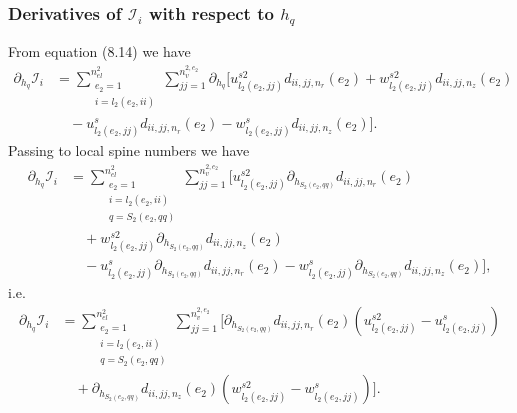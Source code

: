 \documentclass{article}
\begin{document}
\subsubsection{Derivatives of $\mathcal{I}_i$ with respect to $h_q$} %
From equation (8.14) we have
\begin{align}
\partial_{h_q} \mathcal{I}_i &= \sum_{\substack{e_2=1\\ i=l_2(e_2,ii)}}^{n_{el}^2} \sum_{jj=1}^{n_v^{2,e_2}} \partial_{h_q} \Bigg[ u_{l_2(e_2,jj)}^{s2} d_{ii,jj,n_r}(e_2) + w_{l_2(e_2,jj)}^{s2} d_{ii,jj,n_z}(e_2) \nonumber\\
&\quad - u_{l_2(e_2,jj)}^s d_{ii,jj,n_r}(e_2) - w_{l_2(e_2,jj)}^s d_{ii,jj,n_z}(e_2) \Bigg]. \tag{8.23}
\end{align}
Passing to local spine numbers we have
\begin{align}
\partial_{h_q} \mathcal{I}_i &= \sum_{\substack{e_2=1\\ i=l_2(e_2,ii)\\ q=S_2(e_2,qq)}}^{n_{el}^2} \sum_{jj=1}^{n_v^{2,e_2}} \Bigg[ u_{l_2(e_2,jj)}^{s2} \partial_{h_{S_2(e_2,qq)}} d_{ii,jj,n_r}(e_2) \nonumber\\
&\quad + w_{l_2(e_2,jj)}^{s2} \partial_{h_{S_2(e_2,qq)}} d_{ii,jj,n_z}(e_2) \nonumber\\
&\quad - u_{l_2(e_2,jj)}^s \partial_{h_{S_2(e_2,qq)}} d_{ii,jj,n_r}(e_2) - w_{l_2(e_2,jj)}^s \partial_{h_{S_2(e_2,qq)}} d_{ii,jj,n_z}(e_2) \Bigg], \tag{8.24}
\end{align}
i.e.
\begin{align}
\partial_{h_q} \mathcal{I}_i &= \sum_{\substack{e_2=1\\ i=l_2(e_2,ii)\\ q=S_2(e_2,qq)}}^{n_{el}^2} \sum_{jj=1}^{n_v^{2,e_2}} \Bigg[ \partial_{h_{S_2(e_2,qq)}} d_{ii,jj,n_r}(e_2) \left( u_{l_2(e_2,jj)}^{s2} - u_{l_2(e_2,jj)}^s \right) \nonumber\\
&\quad + \partial_{h_{S_2(e_2,qq)}} d_{ii,jj,n_z}(e_2) \left( w_{l_2(e_2,jj)}^{s2} - w_{l_2(e_2,jj)}^s \right) \Bigg]. \tag{8.25}
\end{align}
\end{document}
